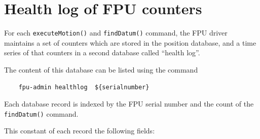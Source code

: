 \documentclass[11pt,a4paper]{scrartcl}
\begin{document}
\section{Health log of FPU counters}
\label{sec:healthlog}

For each \texttt{executeMotion()} and \texttt{findDatum()} command,
the FPU driver maintains a set of counters which are stored in the
position database, and a time series of that counters in a second
database called ``health log''.

The content of this database can be listed using the command

\begin{verbatim}
    fpu-admin healthlog  ${serialnumber}
\end{verbatim}

Each database record is indexed by the FPU serial number and the count
of the \texttt{findDatum()} command.

This constant of each record the following fields:
\end{document}
